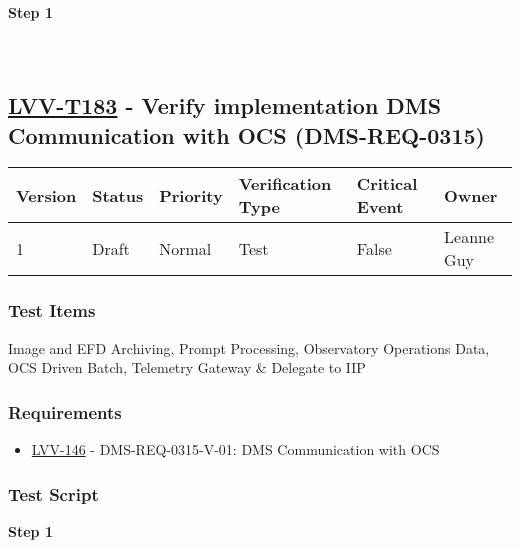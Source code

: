 \textbf{Step 1}\\
~\\
~\\

\hypertarget{lvv-t183---verify-implementation-dms-communication-with-ocs-dms-req-0315}{%
\subsection{\texorpdfstring{\href{https://jira.lsstcorp.org/secure/Tests.jspa\#/testCase/LVV-T183}{LVV-T183}
- Verify implementation DMS Communication with OCS
(DMS-REQ-0315)}{LVV-T183 - Verify implementation DMS Communication with OCS (DMS-REQ-0315)}}\label{lvv-t183---verify-implementation-dms-communication-with-ocs-dms-req-0315}}

\begin{longtable}[]{@{}llllll@{}}
\toprule
Version & Status & Priority & Verification Type & Critical Event &
Owner\tabularnewline
\midrule
\endhead
1 & Draft & Normal & Test & False & Leanne Guy\tabularnewline
\bottomrule
\end{longtable}

\hypertarget{test-items-159}{%
\subsubsection{Test Items}\label{test-items-159}}

Image and EFD Archiving, Prompt Processing, Observatory Operations Data,
OCS Driven Batch, Telemetry Gateway \& Delegate to IIP

\hypertarget{requirements-160}{%
\subsubsection{Requirements}\label{requirements-160}}

\begin{itemize}
\tightlist
\item
  \href{https://jira.lsstcorp.org/browse/LVV-146}{LVV-146} -
  DMS-REQ-0315-V-01: DMS Communication with OCS
\end{itemize}

\hypertarget{test-script-160}{%
\subsubsection{Test Script}\label{test-script-160}}

\textbf{Step 1}\\
~\\
~\\

